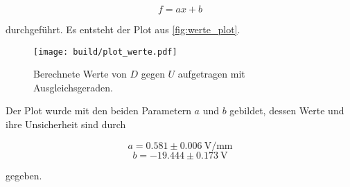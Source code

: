 \begin{equation}
    f = ax + b
\end{equation}

durchgeführt. 
Es entsteht der Plot aus \autoref{fig:werte_plot}.

\begin{figure}
    \centering
    \texttt{[image: build/plot\_werte.pdf]}
    \caption{Berechnete Werte von $D$ gegen $U$ aufgetragen mit Ausgleichsgeraden.}
    \label{fig:werte_plot}
\end{figure}

Der Plot wurde mit den beiden Parametern $a$ und $b$ gebildet, dessen Werte und ihre Unsicherheit sind durch

\begin{equation}
    a = 0.581 \pm \SI{0.006}{\volt\per\milli\meter}
\end{equation}
\begin{equation}
    b = -19.444 \pm \SI{0.173}{\volt}
\end{equation}

gegeben.